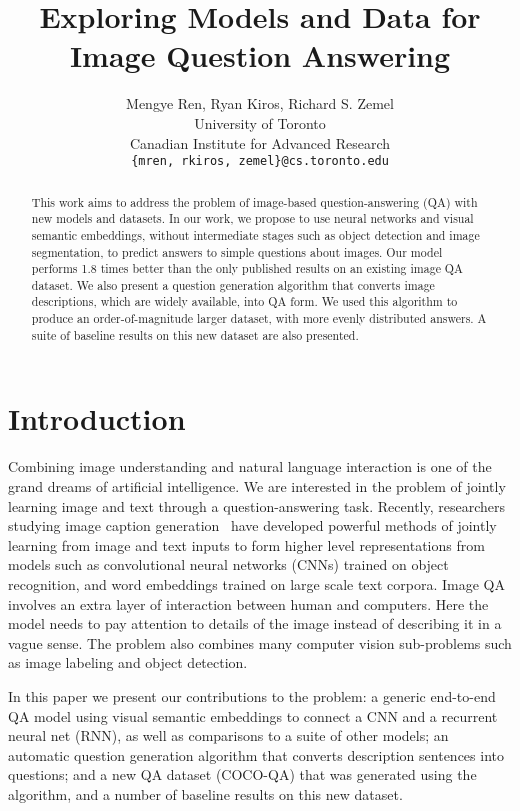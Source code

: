 \documentclass{article} \usepackage{nips15submit_e,times}
\author{
Mengye Ren, Ryan Kiros, Richard S. Zemel\\
University of Toronto\\
Canadian Institute for Advanced Research\\
\texttt{\{mren, rkiros, zemel\}@cs.toronto.edu}
}
\title{Exploring Models and Data for Image Question Answering}
\renewcommand{\#}[1]{\textbf{#1}}
\begin{document}
\maketitle
\begin{abstract}
This work aims to address the problem of image-based question-answering (QA)
with new models and datasets. In our work, we propose to use neural networks
and visual semantic embeddings, without intermediate stages such as object
detection and image segmentation, to predict answers to simple questions about
images. Our model performs 1.8 times better than the only published results on
an existing image QA dataset. We also present a question generation algorithm
that converts image descriptions, which are widely available, into QA form. We
used this algorithm to produce an order-of-magnitude larger dataset, with more
evenly distributed answers. A suite of baseline results on this new dataset are
also presented.
\end{abstract}

\section{Introduction}
Combining image understanding and natural language interaction is one of the
grand dreams of artificial intelligence. We are interested in the problem of
jointly learning image and text through a question-answering task. Recently,
researchers studying image caption generation~\cite{vinyals14,kiros14b,
karpathy14,mao14,donahue14,chen14,fang14,xu15,lebret15,klein15} have developed
powerful methods of jointly learning from image and text inputs to form higher
level representations from models such as convolutional neural networks (CNNs)
trained on object recognition, and word embeddings trained on large scale text
corpora. Image QA involves an extra layer of interaction between human and
computers. Here the model needs to pay attention to details of the image
instead of describing it in a vague sense. The problem also combines many
computer vision sub-problems such as image labeling and object detection.

In this paper we present our contributions to the problem: a generic end-to-end
QA model using visual semantic embeddings to connect a CNN and a recurrent
neural net (RNN), as well as comparisons to a suite of other models; an
automatic question generation algorithm that converts description sentences
into questions; and a new QA dataset (COCO-QA) that was generated using the
algorithm, and a number of baseline results on this new dataset.
\end{document}
